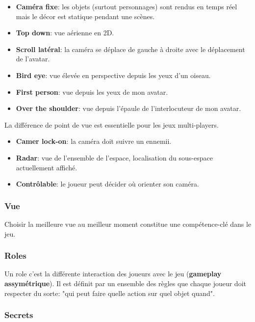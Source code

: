 \begin{itemize}
\item \textbf{Cam\'era fixe}: les objets (surtout personnages) sont rendus en temps r\'eel mais le d\'ecor est statique pendant une sc\`enes.
\item \textbf{Top down}: vue a\'erienne en 2D.
\item \textbf{Scroll lat\'eral}: la cam\'era se d\'eplace de gauche \`a droite avec le d\'eplacement de l'avatar.
\item \textbf{Bird eye}: vue \'elev\'ee en perspective depuis les yeux d'un oiseau.
\item \textbf{First person}: vue depuis les yeux de mon avatar.
\item \textbf{Over the shoulder}: vue depuis l'\'epaule de l'interlocuteur de mon avatar.
\end{itemize}

La diff\'erence de point de vue est essentielle pour les jeux multi-players.

\begin{itemize}
\item \textbf{Camer lock-on}: la cam\'era doit suivre un ennemii.
\item \textbf{Radar}: vue de l'ensemble de l'espace, localisation du sous-espace actuellement affich\'e.
\item \textbf{Contr\^olable}: le joueur peut d\'ecider o\`u orienter son cam\'era.
\end{itemize}

\subsubsection{Vue}

Choisir la meilleure vue au meilleur moment constitue une comp\'etence-cl\'e dans le jeu.

\subsubsection{Roles}

Un role c'est la diff\'erente interaction des joueurs avec le jeu (\textbf{gameplay assym\'etrique}). Il est d\'efinit par un ensemble des r\`egles que chaque joueur doit respecter du sorte: "qui peut faire quelle action sur quel objet quand".

\subsubsection{Secrets}

